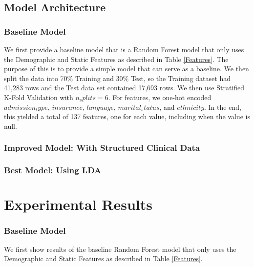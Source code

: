 \documentclass[12pt, final]{article}
\begin{document}
\subsection{Model Architecture}
\label{Model Architecture}

\subsubsection{Baseline Model}
We first provide a baseline model that is a Random Forest model that only uses the Demographic and Static Features as described in Table \ref{Features}. The purpose of this is to provide a simple model that can serve as a baseline. We then split the data into 70\% Training and 30\% Test, so the Training dataset had 41,283 rows and the Test data set contained 17,693 rows. We then use Stratified K-Fold Validation with $n_splits = 6$. For features, we one-hot encoded $admission_type$, $insurance$, $language$, $marital_status$, and $ethnicity$. In the end, this yielded a total of 137 features, one for each value, including when the value is null.

\subsubsection{Improved Model: With Structured Clinical Data}

\subsubsection{Best Model: Using LDA}

\section{Experimental Results}
\label{Experimental Results}

\subsubsection{Baseline Model}
We first show results of the baseline Random Forest model that only uses the Demographic and Static Features as described in Table \ref{Features}.
\end{document}
